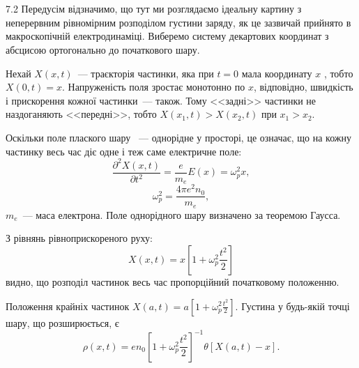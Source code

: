 \protect \section *{}
\begin{Solution}{7.{2}}
	Передусім відзначимо, що тут ми розглядаємо ідеальну картину з неперервним рівномірним розподілом густини заряду, як це зазвичай прийнято в макроскопічній електродинаміці. Виберемо систему декартових координат з абсцисою ортогонально до початкового шару.

	Нехай $X(x,t)$~--- траєкторія частинки, яка при $t = 0$   мала координату $x$ , тобто $X(0,t) = x$. Напруженість поля зростає монотонно по $x$, відповідно, швидкість і прискорення кожної частинки~--- також. Тому <<задні>> частинки не наздоганяють <<передні>>, тобто  $X(x_1,t) > X(x_2,t)$  при ${x_1} > {x_2}$.

		Оскільки поле плаского шару ~--- однорідне у просторі, це означає, що на кожну частинку весь час діє одне і теж саме електричне поле:
		\[
			\frac{{{\partial ^2}X(x,t)}}{{\partial {t^2}}} = \frac{e}{m_e}E(x) = \omega _p^2x,
		\]
		\[
			\omega _p^2 = \frac{{4\pi {e^2}{n_0}}}{m_e},
		\]
	$m_e$~--- маса електрона. Поле однорідного шару визначено за теоремою Гаусса.

		З рівнянь рівноприскореного руху:
		\[
			X(x,t) = x\left[ {1 + \omega _p^2\frac{{{t^2}}}{2}} \right]
		\]
		видно, що розподіл частинок весь час пропорційний початковому положенню.

		Положення крайніх частинок $X(a,t) = a\left[ {1 + \omega _p^2\frac{{{t^2}}}{2}} \right]$.
	Густина у будь-якій точці шару, що розширюється, є
	\[
		\rho (x,t) = e{n_0}{\left[ {1 + \omega _p^2\frac{{{t^2}}}{2}} \right]^{ - 1}}\theta \left[ {X(a,t) - x} \right].
	\]
\end{Solution}
